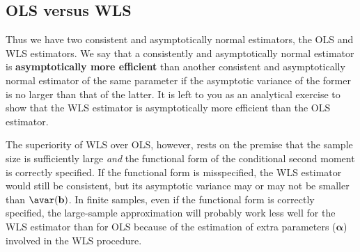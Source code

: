 \subsection*{OLS versus WLS}

Thus we have two consistent and asymptotically normal estimators, the OLS and WLS
estimators.  We say that a consistently and asymptotically normal estimator is
\textbf{asymptotically more efficient} than another consistent and asymptotically normal
estimator of the same parameter if the asymptotic variance of the former is no larger
than that of the latter.  It is left to you as an analytical exercise to show that the WLS
estimator is asymptotically more efficient than the OLS estimator.

The superiority of WLS over OLS, however, rests on the premise that the sample size is
sufficiently large \emph{and} the functional form of the conditional second moment is
correctly specified.  If the functional form is misspecified, the WLS estimator would
still be consistent, but its asymptotic variance may or may not be smaller than
$\avar(\mathbf{b})$.  In finite samples, even if the functional form is correctly
specified, the large-sample approximation will probably work less well for the WLS
estimator than for OLS because of the estimation of extra parameters ($\bm{\alpha}$)
involved in the WLS procedure.
